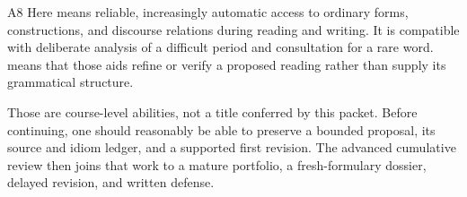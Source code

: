 \begin{courseunit}{A8}
Here  means reliable, increasingly automatic access to ordinary
forms, constructions, and discourse relations during reading and writing. It
is compatible with deliberate analysis of a difficult period and consultation
for a rare word.  means that those aids refine or verify a
proposed reading rather than supply its grammatical structure.

Those are course-level abilities, not a title conferred by this packet. Before
continuing, one should reasonably be able to preserve a bounded proposal, its
source and idiom ledger, and a supported first revision. The advanced
cumulative review then joins that work to a mature portfolio, a fresh-formulary
dossier, delayed revision, and written defense.
\end{courseunit}
